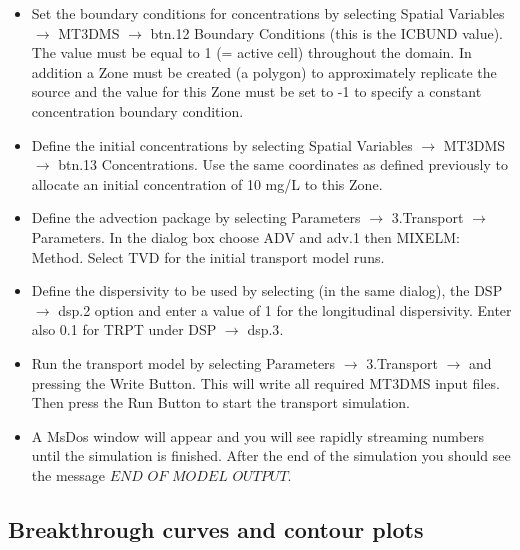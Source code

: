 \begin{itemize}

\item Set the boundary conditions for concentrations by selecting 
{\color{blue}Spatial Variables} $\rightarrow$ {\color{blue}MT3DMS} 
$\rightarrow$ {\color{blue}btn.12 Boundary Conditions} (this is the ICBUND value). 
The value must be equal to 1 (= active cell) throughout the domain. In addition 
a {\color{blue}Zone} must be created (a polygon) to approximately replicate 
the source and the value for this {\color{blue}Zone} must be set to -1 
to specify a constant concentration boundary condition.

\item Define the initial concentrations by selecting 
{\color{blue}Spatial Variables} $\rightarrow$ {\color{blue}MT3DMS} 
$\rightarrow$ {\color{blue}btn.13 Concentrations}. 
Use the same coordinates as defined previously to allocate 
an initial concentration of 10 mg/L to this {\color{blue}Zone}.

\item Define the advection package by selecting 
{\color{blue}Parameters} $\rightarrow$ {\color{blue}3.Transport} $\rightarrow$ 
{\color{blue}Parameters}. In the dialog box choose {\color{blue}ADV} and  
{\color{blue}adv.1} then {\color{blue}MIXELM: Method}. 
Select {\color{blue}TVD} for the initial transport model runs.

\item Define the dispersivity to be used by selecting (in the same dialog), 
the {\color{blue}DSP} $\rightarrow$ {\color{blue}dsp.2} option and 
enter a value of 1 for the longitudinal 
dispersivity. Enter also 0.1 for TRPT under {\color{blue}DSP} $\rightarrow$ {\color{blue}dsp.3}. 

\item Run the transport model by selecting 
{\color{blue}Parameters} $\rightarrow$ 
{\color{blue}3.Transport} $\rightarrow$ and pressing the {\color{blue}Write Button}. 
This will write all required {\color{blue}MT3DMS} 
input files. Then press the {\color{blue}Run Button} to start the transport simulation.

\item A MsDos window will appear and you will see rapidly streaming numbers 
until the simulation is finished. After the end of the simulation
you should see the message $END$ $OF$ $MODEL$ $OUTPUT$. 

\end{itemize}

\subsection{Breakthrough curves and contour plots}

